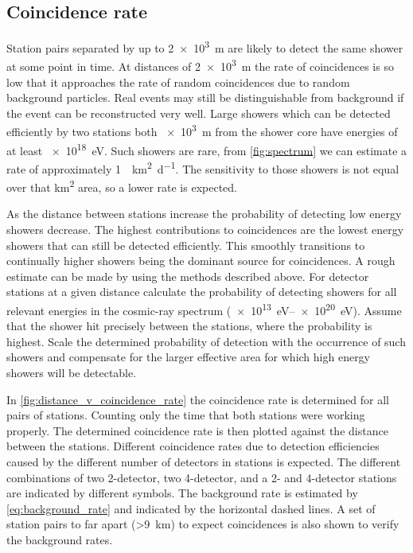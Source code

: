 \subsection{Coincidence rate}

Station pairs separated by up to \SI{2e3}{\meter} are likely to detect the same shower at some point in time. At distances of \SI{2e3}{\meter} the rate of coincidences is so low that it approaches the rate of random coincidences due to random background particles. Real events may still be distinguishable from background if the event can be reconstructed very well. Large showers which can be detected efficiently by two stations both \SI{e3}{\meter} from the shower core have energies of at least \SI{e18}{\eV}. Such showers are rare, from \cref{fig:spectrum} we can estimate a rate of approximately \SI{1}{\per\kilo\meter\squared\per\day}. The sensitivity to those showers is not equal over that \si{\kilo\meter\squared} area, so a lower rate is expected.

As the distance between stations increase the probability of detecting low energy showers decrease. The highest contributions to coincidences are the lowest energy showers that can still be detected efficiently. This smoothly transitions to continually higher showers being the dominant source for coincidences. A rough estimate can be made by using the methods described above. For detector stations at a given distance calculate the probability of detecting showers for all relevant energies in the cosmic-ray spectrum (\SIrange{e13}{e20}{\eV}). Assume that the shower hit precisely between the stations, where the probability is highest. Scale the determined probability of detection with the occurrence of such showers and compensate for the larger effective area for which high energy showers will be detectable.

In \cref{fig:distance_v_coincidence_rate} the coincidence rate is determined for all pairs of stations. Counting only the time that both stations were working properly. The determined coincidence rate is then plotted against the distance between the stations. Different coincidence rates due to detection efficiencies caused by the different number of detectors in stations is expected. The different combinations of two 2-detector, two 4-detector, and a 2- and 4-detector stations are indicated by different symbols. The background rate is estimated by \cref{eq:background_rate} and indicated by the horizontal dashed lines. A set of station pairs to far apart (\SI{>9}{\kilo\meter}) to expect coincidences is also shown to verify the background rates.


